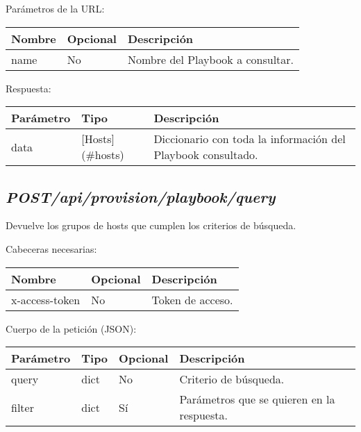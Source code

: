 		Parámetros de la URL:
		\begin{table}[h!]
			\centering
	\begin{adjustbox}{max width=\textwidth}
			\begin{tabular}{|l|l|l|}
				\hline
				Nombre & Opcional & Descripción \\ \hline
				name & No & Nombre del Playbook a consultar. \\ \hline
			\end{tabular}
\end{adjustbox}
		\end{table}
		
		Respuesta:
		\begin{table}[h!]
			\centering
	\begin{adjustbox}{max width=\textwidth}
			\begin{tabular}{|l|l|l|}
				\hline
				Parámetro & Tipo & Descripción \\ \hline
				data & [Hosts](\#hosts) & Diccionario con toda la información del Playbook consultado. \\ \hline
			\end{tabular}
\end{adjustbox}
		\end{table}
	
	
	
	\subsection{\textit{POST/api/provision/playbook/query}}
		Devuelve los grupos de hosts que cumplen los criterios de búsqueda.
		
		Cabeceras necesarias:
		\begin{table}[h!]
			\centering
	\begin{adjustbox}{max width=\textwidth}
			\begin{tabular}{|l|l|l|}
				\hline
				Nombre & Opcional & Descripción \\ \hline
				x-access-token & No & Token de acceso. \\ \hline
			\end{tabular}
\end{adjustbox}
		\end{table}
		
		Cuerpo de la petición (JSON):
		\begin{table}[h!]
			\centering
	\begin{adjustbox}{max width=\textwidth}
			\begin{tabular}{|l|l|l|l|}
				\hline
				Parámetro & Tipo & Opcional & Descripción \\ \hline
				query & dict & No & Criterio de búsqueda. \\ \hline
				filter & dict & Sí & Parámetros que se quieren en la respuesta. \\ \hline
			\end{tabular}
\end{adjustbox}
		\end{table}
		
